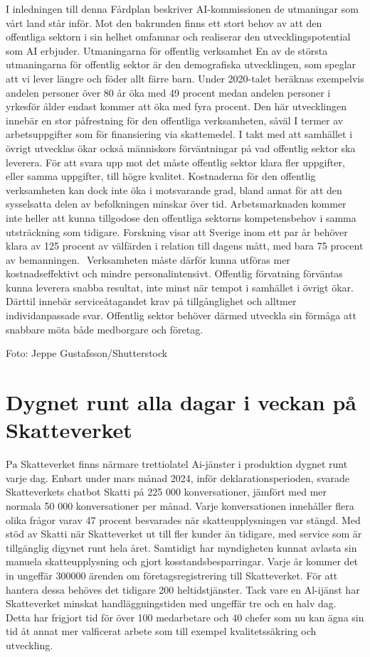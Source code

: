 {{{{{{{{{{{{{{I inledningen till denna Fårdplan beskriver AI-kommissionen de utmaningar som vårt land står inför. Mot den bakrunden finns ett stort behov av att den offentliga sektorn i sin helhet omfamnar och realiserar den utvecklingspotential som AI erbjuder.
Utmaningarna för offentlig verksamhet En av de största utmaningarna för offentlig sektor är den demografiska utvecklingen, som speglar att vi lever längre och föder allt färre barn. Under 2020-talet beräknas exempelvis andelen personer över 80 år öka med 49 procent medan andelen personer i yrkesför ålder endast kommer att öka med fyra procent. Den här utvecklingen innebär en stor påfrestning för den offentliga verksamheten, såväl I termer av arbetsuppgifter som för finansiering via skattemedel. I takt med att samhället i övrigt utvecklas ökar också människors förväntningar på vad offentlig sektor ska leverera. För att svara upp mot det måste offentlig sektor klara fler uppgifter, eller samma uppgifter, till högre kvalitet.
Kostnaderna för den offentlig verksamheten kan dock inte öka i motsvarande grad, bland annat för att den sysselsatta delen av befolkningen minskar över tid. Arbetsmarknaden kommer inte heller att kunna tillgodose den offentliga sektorns kompetensbehov i samma utsträckning som tidigare. Forskning visar att Sverige inom ett par år behöver klara av 125 procent av välfärden i relation till dagens mått, med bara 75 procent av bemanningen. \({ }^{}\) Verksamheten måste därför kunna utföras mer kostnadseffektivt och mindre personalintensivt.
Offentlig förvatning förväntas kunna leverera snabba resultat, inte minst när tempot i samhället i övrigt ökar. Därttil innebär serviceåtagandet krav på tillgånglighet och alltmer individanpassade svar. Offentlig sektor behöver därmed utveckla sin förmåga att snabbare möta både medborgare och företag.

Foto: Jeppe Gustafsson/Shutterstock
\section*{Dygnet runt alla dagar i veckan på Skatteverket}
\(\mathrm{Pa}\) Skatteverket finns närmare trettiolatel Ai-jänster i produktion dygnet runt varje dag. Enbart under mars månad 2024, inför deklarationsperioden, svarade Skatteverkets chatbot Skatti på 225 000 konversationer, jämfört med mer normala 50 000 konversationer per månad. Varje konversationen innehåller flera olika frågor varav 47 procent besvarades när skatteupplysningen var stängd. Med stöd av Skatti när Skatteverket ut till fler kunder än tidigare, med service som är tillgänglig digynet runt hela året. Samtidigt har myndigheten kunnat avlasta sin manuela skatteupplysning och gjort kosstandsbesparringar.
Varje år kommer det in ungeffär 300000 ärenden om företagsregistrering till Skatteverket. För att hantera dessa behöves det tidigare 200 heltidstjänster. Tack vare en Al-ijänst har Skatteverket minskat handläggningstiden med ungeffär tre och en halv dag. Detta har frigjort tid för över 100 medarbetare och 40 chefer som nu kan ägna sin tid åt annat mer valficerat arbete som till exempel kvalitetssäkring och utveckling.

}}}}}}}}}}}}}}
